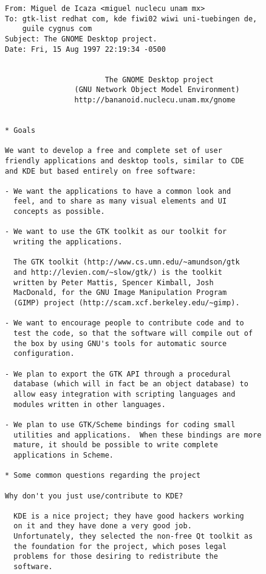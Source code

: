 \begin{lstlisting}[basicstyle=\footnotesize,
    frame=single,
    framerule=0pt,
    backgroundcolor=\color{lightgray},
    xleftmargin=0pt]
From: Miguel de Icaza <miguel nuclecu unam mx>
To: gtk-list redhat com, kde fiwi02 wiwi uni-tuebingen de,
    guile cygnus com
Subject: The GNOME Desktop project.
Date: Fri, 15 Aug 1997 22:19:34 -0500


                       The GNOME Desktop project
                (GNU Network Object Model Environment)
                http://bananoid.nuclecu.unam.mx/gnome


* Goals

We want to develop a free and complete set of user
friendly applications and desktop tools, similar to CDE
and KDE but based entirely on free software:

- We want the applications to have a common look and
  feel, and to share as many visual elements and UI
  concepts as possible.

- We want to use the GTK toolkit as our toolkit for
  writing the applications.

  The GTK toolkit (http://www.cs.umn.edu/~amundson/gtk
  and http://levien.com/~slow/gtk/) is the toolkit
  written by Peter Mattis, Spencer Kimball, Josh
  MacDonald, for the GNU Image Manipulation Program
  (GIMP) project (http://scam.xcf.berkeley.edu/~gimp).

- We want to encourage people to contribute code and to
  test the code, so that the software will compile out of
  the box by using GNU's tools for automatic source
  configuration.

- We plan to export the GTK API through a procedural
  database (which will in fact be an object database) to
  allow easy integration with scripting languages and
  modules written in other languages.

- We plan to use GTK/Scheme bindings for coding small
  utilities and applications.  When these bindings are more
  mature, it should be possible to write complete
  applications in Scheme.

* Some common questions regarding the project

Why don't you just use/contribute to KDE?

  KDE is a nice project; they have good hackers working
  on it and they have done a very good job.
  Unfortunately, they selected the non-free Qt toolkit as
  the foundation for the project, which poses legal
  problems for those desiring to redistribute the
  software.


\end{lstlisting}
